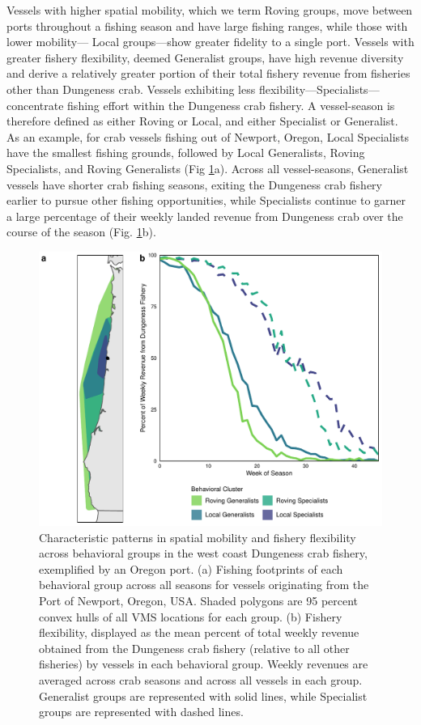 \documentclass[9pt,twocolumn,twoside,lineno]{pnas-new}
\begin{document}
Vessels with higher spatial mobility, which we term Roving groups, move
between ports throughout a fishing season and have large fishing ranges,
while those with lower mobility--- Local groups---show greater fidelity
to a single port. Vessels with greater fishery flexibility, deemed
Generalist groups, have high revenue diversity and derive a relatively
greater portion of their total fishery revenue from fisheries other than
Dungeness crab. Vessels exhibiting less
flexibility---Specialists---concentrate fishing effort within the
Dungeness crab fishery. A vessel-season is therefore defined as either
Roving or Local, and either Specialist or Generalist. As an example, for
crab vessels fishing out of Newport, Oregon, Local Specialists have the
smallest fishing grounds, followed by Local Generalists, Roving
Specialists, and Roving Generalists (Fig \ref{fig:characteristics}a).
Across all vessel-seasons, Generalist vessels have shorter crab fishing
seasons, exiting the Dungeness crab fishery earlier to pursue other
fishing opportunities, while Specialists continue to garner a large
percentage of their weekly landed revenue from Dungeness crab over the
course of the season (Fig. \ref{fig:characteristics}b).

\begin{figure}%
\includegraphics[width=\linewidth]{groups_mobility_flexibility.pdf}
\caption{Characteristic patterns in spatial mobility and fishery flexibility across behavioral groups in the west coast Dungeness crab fishery, exemplified by an Oregon port. (a) Fishing footprints of each behavioral group across all seasons for vessels originating from the Port of Newport, Oregon, USA. Shaded polygons are 95 percent convex hulls of all VMS locations for each group. (b) Fishery flexibility, displayed as the mean percent of total weekly revenue obtained from the Dungeness crab fishery (relative to all other fisheries) by vessels in each behavioral group. Weekly revenues are averaged across crab seasons and across all vessels in each group. Generalist groups are represented with solid lines, while Specialist groups are represented with dashed lines.}
\label{fig:characteristics}
\end{figure}
\end{document}
